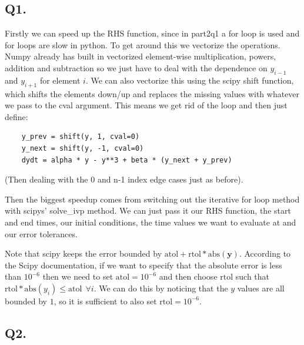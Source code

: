 \documentclass[a4paper, oneside]{book}
\begin{document}
\subsection*{Q1.}
Firstly we can speed up the RHS function, since in part2q1 a for loop is used and for loops
are slow in python. To get around this we vectorize the operations. Numpy already has built
in vectorized element-wise multiplication, powers, addition and subtraction so we just have
to deal with the dependence on $y_{i-1}$ and $y_{i+1}$ for element $i$. We can also vectorize this using
the scipy shift function, which shifts the elements down/up and replaces the missing values
with whatever we pass to the cval argument. 
This means we get rid of the loop and then just define:
\begin{blackbox}
\begin{verbatim}
	y_prev = shift(y, 1, cval=0)
	y_next = shift(y, -1, cval=0)
	dydt = alpha * y - y**3 + beta * (y_next + y_prev)
\end{verbatim}
    
\end{blackbox}
(Then dealing with the 0 and n-1 index edge cases just as before).

Then the biggest speedup comes from switching out the iterative for loop method
with scipys' solve\_ivp method. We can just pass it our RHS function, the start and end
times, our initial conditions, the time values we want to evaluate at and our error tolerances.

Note that scipy keeps the error bounded by $\text{atol} + \text{rtol} * \text{abs}(\mathbf{y})$. According to the Scipy documentation, if we want to specify that the absolute error is less than $10^{-6}$ then we need to set $\text{atol} = 10^{-6}$ and then choose
$\text{rtol}$ such that $\text{rtol} * \text{abs}(y_{i}) \leq \text{atol} ~ ~ \forall i$.
We can do this by noticing that the $y$ values are all bounded by $1$, so it is sufficient to also set $\text{rtol} = 10^{-6}$.

\subsection*{Q2.}
\end{document}
